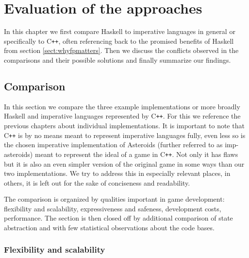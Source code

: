\documentclass[
  digital, %
  color,   %
  table,   %
  oneside, %
  lof,     %
  lot,     %
]{fithesis3}
\newcommand{\cpp}{C\nolinebreak\texttt{+}\nolinebreak\texttt{+}}
\begin{document}
{%

\chapter{Evaluation of the approaches}
\label{chptr:evaluation}

In this chapter we first compare Haskell to imperative languages in general or specifically to \cpp{},
often referencing back to the promised benefits of Haskell from section \ref{sect:whyfpmatters}.
Then we discuss the conflicts observed in the comparisons and their possible solutions
and finally summarize our findings.


\section{Comparison}

In this section we compare the three example implementations or more broadly Haskell and
imperative languages represented by \cpp{}.
For this we reference the previous chapters about individual implementations.
It is important to note that \cpp{} is by no means meant
to represent imperative languages fully, even less so is the chosen imperative implementation
of Asteroids (further referred to as imp-asteroids) meant to represent
the ideal of a game in \cpp{}. Not only it has flaws but it is also an even
simpler version of the original game in some ways than our two implementations.
We try to address this in especially relevant places,
in others, it is left out for the sake of conciseness and readability.

The comparison is organized by qualities important in game development:
flexibility and scalability, expressiveness and safeness, development costs, performance.
The section is then closed off by additional comparison of state abstraction
and with few statistical observations about the code bases.



\subsection{Flexibility and scalability}

}
\end{document}
